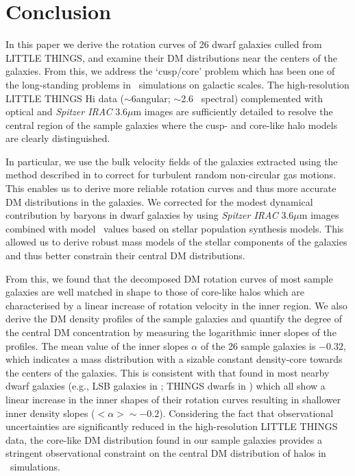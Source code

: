 \documentclass[natbib209]{emulateapj}
\begin{document}
\section{Conclusion} \label{CONCLUSIONS}

In this paper we derive the rotation curves of 26 dwarf galaxies culled from
LITTLE THINGS, and examine their DM distributions near the centers of
the galaxies. From this, we address the `cusp/core' problem which has been one
of the long-standing problems in \LCDM\ simulations on galactic
scales. The high-resolution LITTLE THINGS H{\sc i} data ($\sim$6\arcsec angular;
$\sim$2.6 \kms\ spectral) complemented with optical and {\it Spitzer IRAC} 3.6$\mu$m images 
are sufficiently detailed to resolve the central region of the sample galaxies where the cusp- and
core-like halo models are clearly distinguished. 

In particular, we use the bulk velocity fields of the galaxies extracted using
the method described in \cite{Oh_2008} to correct for turbulent random non-circular
gas motions. This enables us to derive more reliable rotation curves and thus
more accurate DM distributions in the galaxies. We corrected for the modest dynamical 
contribution by baryons in dwarf galaxies by using {\it Spitzer IRAC} 3.6$\mu$m images combined with 
model \MLsps\ values based on stellar population synthesis models. This allowed us to
derive robust mass models of the stellar components of the galaxies and thus better
constrain their central DM distributions. 

From this, we found that the decomposed DM rotation curves of most
sample galaxies are well matched in shape to those of core-like halos which
are characterised by a linear increase of rotation velocity in the inner region. We also
derive the DM density profiles of the sample galaxies and quantify the
degree of the central DM concentration by measuring the logarithmic
inner slopes of the profiles. The mean value of the inner slopes $\alpha$ of
the 26 sample galaxies is $-0.32$, which indicates a mass distribution with a
sizable constant density-core towards the centers of the galaxies. This is
consistent with that found in most nearby dwarf galaxies (e.g., LSB galaxies in
\citeauthor{deBlok_2002} \citeyear{deBlok_2002}; THINGS dwarfs in
\citeauthor{Oh_2011a} \citeyear{Oh_2011a}) which all show a linear
increase in the inner shapes of their rotation curves resulting in shallower
inner density slopes ($<\alpha>\sim-0.2$). Considering the fact that observational
uncertainties are significantly reduced in the high-resolution LITTLE THINGS
data, the core-like DM distribution found in our sample galaxies
provides a stringent observational constraint on the central DM 
distribution of halos in \LCDM\ simulations. 
\end{document}
